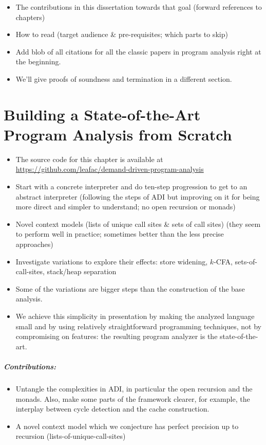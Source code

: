 \documentclass[12pt, oneside]{book}
\begin{document}
\begin{itemize}
  \item The contributions in this dissertation towards that goal (forward references to chapters)
  \item How to read (target audience \& pre-requisites; which parts to skip)
  \item Add blob of all citations for all the classic papers in program analysis right at the beginning.
  \item We’ll give proofs of soundness and termination in a different section.
\end{itemize}

\chapter{Building a State-of-the-Art Program Analysis from Scratch}
\label{section:building-a-state-of-the-art-program-analysis-from-scratch}

\begin{itemize}
  \item The source code for this chapter is available at \url{https://github.com/leafac/demand-driven-program-analysis}
  \item Start with a concrete interpreter and do ten-step progression to get to an abstract interpreter (following the steps of ADI but improving on it for being more direct and simpler to understand; no open recursion or monads)
  \item Novel context models (lists of unique call sites \& sets of call sites) (they seem to perform well in practice; sometimes better than the less precise approaches)
  \item Investigate variations to explore their effects: store widening, \(k\)-CFA, sets-of-call-sites, stack/heap separation
  \item Some of the variations are bigger steps than the construction of the base analysis.
  \item  We achieve this simplicity in presentation by making the analyzed language small and by using relatively straightforward programming techniques, not by compromising on features: the resulting program analyzer is the state-of-the-art.
\end{itemize}

\paragraph{Contributions:}

\begin{itemize}
  \item Untangle the complexities in ADI, in particular the open recursion and the monads. Also, make some parts of the framework clearer, for example, the interplay between cycle detection and the cache construction.
  \item A novel context model which we conjecture has perfect precision up to recursion (lists-of-unique-call-sites)
\end{itemize}
\end{document}
